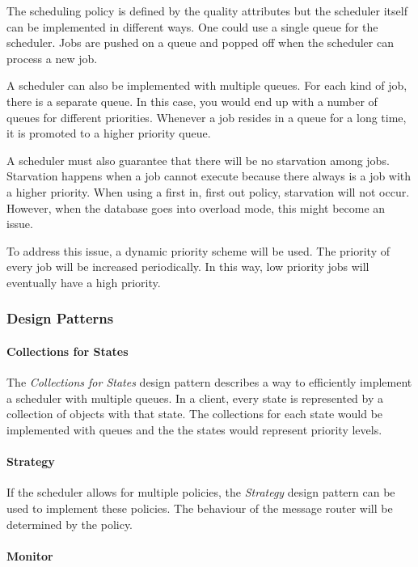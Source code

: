 \npar The scheduling policy is defined by the quality attributes but the
scheduler itself can be implemented in different ways. One could use a single
queue for the scheduler. Jobs are pushed on a queue and popped off when the
scheduler can process a new job. 

\npar A scheduler can also be implemented with multiple queues. For each kind of
job, there is a separate queue. In this case, you would end up with a number of
queues for different priorities. Whenever a job resides in a queue for a long
time, it is promoted to a higher priority queue. 

\npar A scheduler must also guarantee that there will be no starvation among
jobs. Starvation happens when a job cannot execute because there always is a
job with a higher priority. When using a first in, first out policy, starvation
will not occur. However, when the database goes into overload mode, this might
become an issue. 

\npar To address this issue, a dynamic priority scheme will be used. The
priority of every job will be increased periodically. In this way, low priority
jobs will eventually have a high priority. 

\subsubsection{Design Patterns}
\label{add:it3/patterns}

\paragraph{Collections for States}

\npar The \emph{Collections for States} design pattern describes a way to
efficiently implement a scheduler with multiple queues. In a client, every state is
represented by a collection of objects with that state. The collections for
each state would be implemented with queues and the the states would represent
priority levels.

\paragraph{Strategy}

\npar If the scheduler allows for multiple policies, the \emph{Strategy} design
pattern can be used to implement these policies. The behaviour of the message router
will be determined by the policy.

\paragraph{Monitor} 

